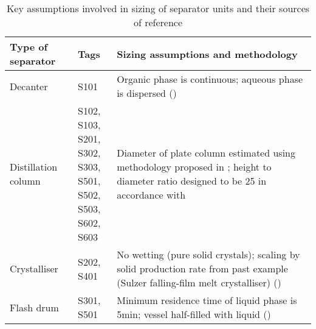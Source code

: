 \begin{table}[h]
\centering
    \caption{Key assumptions involved in sizing of separator units and their sources of reference}
    \label{tab:assumptions of sizing separator units}\footnotesize

\begin{tabularx}{\linewidth}{llX}
\toprule
Type of separator & Tags  & Sizing assumptions and methodology    \\ \midrule
Decanter      & S101  & Organic phase   is continuous; aqueous phase is dispersed    (\textcite{ludwig_applied_1994})  \\ 

Distillation   column   & \splitcell{S102, S103,\\ S201, S302,\\ S303, S501,\\ S502, S503,\\ S602, S603} & Diameter of plate column estimated using methodology proposed in \textcite{seider_product_2009,seader_separation_2011}; height to diameter ratio designed to be 25 in accordance with \textcite{douglas_conceptual_1988} \\ 
Crystalliser & S202, S401    & No wetting   (pure solid crystals); scaling by solid production rate from past example (Sulzer falling-film melt crystalliser)  (\textcite{seader_separation_2011})  \\ 
Flash drum     & S301, S501    & Minimum   residence time of liquid phase is 5min; vessel half-filled with liquid (\textcite{seader_separation_2011}) \\ \bottomrule
\end{tabularx}%

\end{table}

